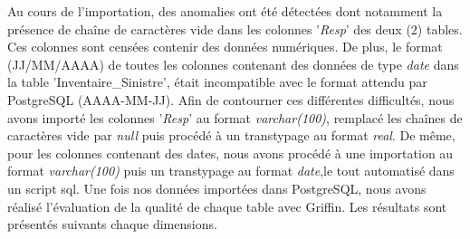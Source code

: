 Au cours de l'importation, des anomalies ont \'et\'e d\'etect\'ees dont notamment la pr\'esence de chaîne de caract\`eres vide dans les colonnes '\emph{Resp}' des deux (2) tables. Ces colonnes sont cens\'ees contenir des donn\'ees num\'eriques. De plus, le format (JJ/MM/AAAA) de toutes les colonnes contenant des donn\'ees de type \textit{date} dans la table 'Inventaire\_Sinistre', \'etait incompatible avec le format attendu par PostgreSQL (AAAA-MM-JJ). Afin de contourner ces diff\'erentes difficult\'es, nous avons import\'e les colonnes '\emph{Resp}' au format \textit{varchar(100)}, remplac\'e les chaînes de caract\`eres vide par \textit{null} puis proc\'ed\'e \`a un transtypage au format \textit{real}. De m\^eme, pour les colonnes contenant des dates, nous avons proc\'ed\'e \`a une importation au format \textit{varchar(100)} puis un transtypage au format \textit{date},le tout automatis\'e dans un script \acrshort{sql}. Une fois nos donn\'ees import\'ees dans PostgreSQL, nous avons r\'ealis\'e l'\'evaluation de la qualit\'e  de chaque table avec Griffin. Les r\'esultats sont pr\'esent\'es suivants chaque dimensions.

